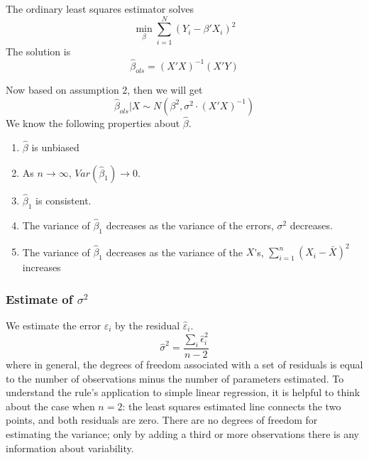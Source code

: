 \documentclass[11pt, a4paper, oneside]{article}
\theoremstyle{definition}
\theoremstyle{proposition}
\theoremstyle{corollary}
\theoremstyle{lemma}
\theoremstyle{theorem}
\begin{document}
The ordinary least squares estimator solves
$$\min_{\beta}\sum_{i=1}^N(Y_i - \beta'X_i)^2$$
The solution is 
$$\hat{\beta}_{ols} = (X'X)^{-1}(X'Y)$$

Now based on assumption 2, then we will get
$$\hat{\beta}_{ols}|X \sim N(\beta^2, \sigma^2\cdot (X'X)^{-1})$$
We know the following properties about $\hat{\beta}$. 
\begin{enumerate}
\item $\hat{\beta}$ is unbiased
\item As $n \to \infty$, $Var(\hat{\beta}_1) \to 0$. 
\item $\hat{\beta}_1$ is consistent. 
\item The variance of $\hat{\beta}_1$ decreases as the variance of the errors, $\sigma^2$ decreases.
\item The variance of $\hat{\beta}_1$ decreases as the variance of the $X$'s, $\sum_{i=1}^n(X_i-\bar{X})^2$ increases
\end{enumerate}

\subsubsection{Estimate of $\sigma^2$}
We estimate the error $\varepsilon_i$ by the residual $\hat{\varepsilon}_i$. 
$$\hat{\sigma}^2 = \frac{\sum_i \hat{\epsilon}_i^2}{n-2}$$ where in general, the degrees of freedom associated with a set of residuals is equal to the number of observations minus the number of parameters estimated. To understand the rule's application to simple linear regression, it is helpful to think about the case when $n=2$: the least squares estimated line connects the two points, and both residuals are zero. There are no degrees of freedom for estimating the variance; only by adding a third or more observations there is any information about variability. 
\end{document}

